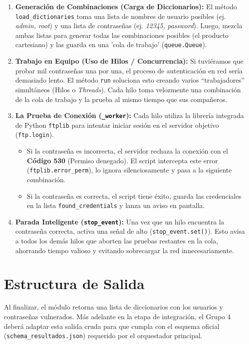 \documentclass[12pt,a4paper]{article}
\begin{document}
\begin{enumerate}
    \item \textbf{Generación de Combinaciones (Carga de Diccionarios):} 
    El método \texttt{load\_dictionaries} toma una lista de nombres de usuario posibles (ej. \textit{admin, root}) y una lista de contraseñas (ej. \textit{12345, password}). Luego, mezcla ambas listas para generar todas las combinaciones posibles (el producto cartesiano) y las guarda en una 'cola de trabajo' (\texttt{queue.Queue}).

    \item \textbf{Trabajo en Equipo (Uso de Hilos / Concurrencia):}
    Si tuviéramos que probar mil contraseñas una por una, el proceso de autenticación en red sería demasiado lento. El método \texttt{run} soluciona esto creando varios ``trabajadores'' simultáneos (Hilos o \textit{Threads}). Cada hilo toma velozmente una combinación de la cola de trabajo y la prueba al mismo tiempo que sus compañeros.

    \item \textbf{La Prueba de Conexión (\texttt{\_worker}):}
    Cada hilo utiliza la librería integrada de Python \texttt{ftplib} para intentar iniciar sesión en el servidor objetivo (\texttt{ftp.login}). 
    \begin{itemize}
        \item Si la contraseña es incorrecta, el servidor rechaza la conexión con el \textbf{Código 530} (Permiso denegado). El script intercepta este error (\texttt{ftplib.error\_perm}), lo ignora silenciosamente y pasa a la siguiente combinación.
        \item Si la contraseña es correcta, el script tiene éxito, guarda las credenciales en la lista \texttt{found\_credentials} y lanza un aviso en pantalla.
    \end{itemize}

    \item \textbf{Parada Inteligente (\texttt{stop\_event}):}
    Una vez que un hilo encuentra la contraseña correcta, activa una señal de alto (\texttt{stop\_event.set()}). Esto avisa a todos los demás hilos que aborten las pruebas restantes en la cola, ahorrando tiempo valioso y evitando sobrecargar la red innecesariamente.
\end{enumerate}

\section*{Estructura de Salida}
Al finalizar, el módulo retorna una lista de diccionarios con los usuarios y contraseñas vulnerados. Más adelante en la etapa de integración, el Grupo 4 deberá adaptar esta salida cruda para que cumpla con el esquema oficial (\texttt{schema\_resultados.json}) requerido por el orquestador principal.
\end{document}
